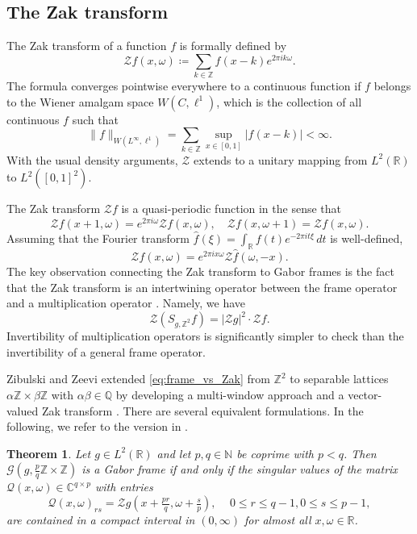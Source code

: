 \documentclass[reqno,a4paper,12pt]{amsart}
\numberwithin{equation}{section}
\newtheorem{theorem}[definition]{Theorem}
\newcommand{\N}{\mathbb N}
\newcommand{\Z}{\mathbb Z}
\newcommand{\R}{\mathbb R}
\newcommand{\C}{\mathbb C}
\newcommand{\Q}{\mathbb Q}
\newcommand{\calG}{\mathcal G}
\newcommand{\QQ}{\mathcal{Q}}
\newcommand{\zak}{\mathcal{Z}}
\begin{document}
\subsection{The Zak transform}\label{sec:zak}

The Zak transform of a function $f$ is formally defined by 
\begin{equation}
    \zak f(x,\omega)
\coloneqq
\sum_{k\in\Z}f(x- k)e^{2\pi i k\omega}.
\end{equation}
The formula converges pointwise everywhere to a continuous function if $f$ belongs to the Wiener amalgam space $W(C,\ell^1)$, which is the collection of all continuous $f$ such that
$$
\|{f}\|_{W(L^\infty, \ell^1)} =
\sum\limits_{k\in\Z} \sup_{x\in[0,1]} |f(x-k)| <\infty.
$$
With the usual density arguments, $\zak$ extends to a 
unitary mapping from $L^2(\R)$ to $L^2([0,1]^2)$.

The Zak transform $\mathcal{Z} f$ is a quasi-periodic function in the sense that 
\begin{equation}\label{eq:Z_quasip}
  \zak f(x+1,\omega)=e^{2\pi i\omega}\zak f(x,\omega),
\quad
\zak f(x,\omega+1)=\zak f(x,\omega).
\end{equation}
Assuming that the Fourier transform $\hat{f}(\xi) = \int_\R f(t) e^{-2\pi i t \xi} \, dt$ is well-defined,
\begin{equation}\label{eq:Zak_ft}
  \zak f(x,\omega) = e^{2\pi i x\omega} \zak \hat{f}(\omega, -x).  
\end{equation}
The key observation connecting the Zak transform to Gabor frames is the fact that the Zak transform is an intertwining operator between the frame operator and a multiplication operator \cite[Thm.~8.3.1.]{Groechenig2001}. Namely, we have
\begin{equation}\label{eq:frame_vs_Zak}
    \zak (S_{g,\Z^2} f) = |\zak g|^2\cdot \zak f.
\end{equation}
Invertibility of multiplication operators is significantly simpler to check than the invertibility of a general frame operator.

Zibulski and Zeevi extended \eqref{eq:frame_vs_Zak} from $\Z^2$ to separable lattices $\alpha\Z\times\beta\Z$ with $\alpha\beta\in\Q$ by developing a multi-window approach and a vector-valued Zak transform \cite{ZibulskiZeevi1993, ZibulskiZeevi1997}. There are several equivalent formulations. In the following, we refer to the version in \cite[Thm.~7.2.]{GroechenigKoppensteiner2019}.

\begin{theorem}\label{thm:ZZ_crit_cited}
    Let $g\in L^2(\R)$ and let $p,q\in \N$ be coprime with $p<q$. 
    Then $\calG(g,\tfrac{p}{q}\Z\times \Z)$ is a Gabor frame if and only if the singular values of the matrix $\QQ(x,\omega)\in \C^{q\times p}$ with entries 
    \begin{equation}
        \QQ(x,\omega)_{rs} = \zak g( x+\tfrac{pr}{q},  \omega +\tfrac{s}{p}) ,\quad\, 0\leq r\leq q-1, 0\leq s\leq p-1,
    \end{equation}
    are contained in a compact interval in $(0,\infty)$ for almost all $x,\omega\in \R$.
\end{theorem}
\end{document}
